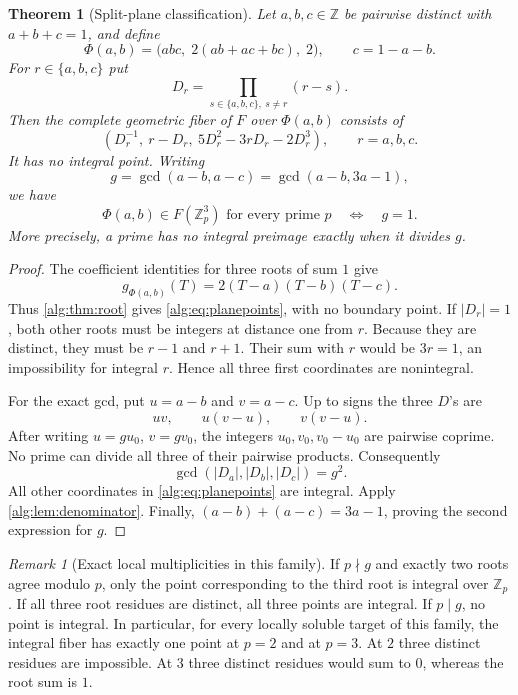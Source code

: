 \documentclass[11pt]{article}
\numberwithin{equation}{section}
\newtheorem{theorem}{Theorem}[section]
\theoremstyle{plain}
\theoremstyle{plain}
\theoremstyle{plain}
\theoremstyle{definition}
\theoremstyle{definition}
\theoremstyle{definition}
\theoremstyle{remark}
\newtheorem{remark}[remark]{Remark}
\newcommand{\Z}{\mathbb Z}\newcommand{\Q}{\mathbb Q}
\begin{document}
\begin{theorem}[Split-plane classification]\label{alg:thm:plane}
Let $a,b,c\in\Z$ be pairwise distinct with $a+b+c=1$, and define
\begin{equation}\label{alg:eq:planemap}
 \Phi(a,b)=\bigl(abc,\;2(ab+ac+bc),\;2\bigr),\qquad c=1-a-b.
\end{equation}
For $r\in\{a,b,c\}$ put
\[
 D_r=\prod_{s\in\{a,b,c\},\ s\ne r}(r-s).
\]
Then the complete geometric fiber of $F$ over $\Phi(a,b)$ consists of
\begin{equation}\label{alg:eq:planepoints}
 \left(D_r^{-1},\ r-D_r,\ 5D_r^2-3rD_r-2D_r^3\right),
 \qquad r=a,b,c.
\end{equation}
It has no integral point. Writing
\begin{equation}\label{alg:eq:primitivecondition}
 g=\gcd(a-b,a-c)=\gcd(a-b,3a-1),
\end{equation}
we have
\begin{equation}\label{alg:eq:alllocalcriterion}
 \Phi(a,b)\in F(\Z_p^3)\text{ for every prime }p
 \quad\Longleftrightarrow\quad g=1.
\end{equation}
More precisely, a prime has no integral preimage exactly when it divides $g$.
\end{theorem}
\begin{proof}
The coefficient identities for three roots of sum $1$ give
\[
 g_{\Phi(a,b)}(T)=2(T-a)(T-b)(T-c).
\]
Thus \cref{alg:thm:root} gives \eqref{alg:eq:planepoints}, with no boundary point.
If $|D_r|=1$, both other roots must be integers at distance one from $r$.
Because they are distinct, they must be $r-1$ and $r+1$. Their sum with
$r$ would be $3r=1$, an impossibility for integral $r$. Hence all three
first coordinates are nonintegral.

For the exact gcd, put $u=a-b$ and $v=a-c$. Up to signs the three
$D$'s are
\[
 uv,\qquad u(v-u),\qquad v(v-u).
\]
After writing $u=gu_0$, $v=gv_0$, the integers $u_0,v_0,v_0-u_0$ are
pairwise coprime. No prime can divide all three of their pairwise products.
Consequently
\begin{equation}\label{alg:eq:gcdD}
 \gcd(|D_a|,|D_b|,|D_c|)=g^2.
\end{equation}
All other coordinates in \eqref{alg:eq:planepoints} are integral. Apply
\cref{alg:lem:denominator}. Finally,
$(a-b)+(a-c)=3a-1$, proving the second expression for $g$.
\end{proof}

\begin{remark}[Exact local multiplicities in this family]
If $p\nmid g$ and exactly two roots agree modulo $p$, only the point
corresponding to the third root is integral over $\Z_p$. If all three
root residues are distinct, all three points are integral. If $p\mid g$,
no point is integral. In particular, for every locally soluble target of
this family, the integral fiber has exactly one point at $p=2$ and at
$p=3$. At $2$ three distinct residues are impossible. At $3$ three distinct
residues would sum to $0$, whereas the root sum is $1$.
\end{remark}
\end{document}
